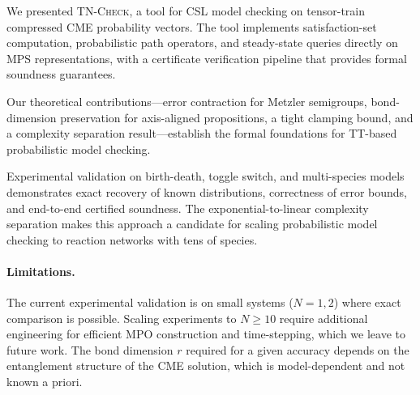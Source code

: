 \documentclass[11pt]{article}
\newcommand{\tncheck}{\textsc{TN-Check}}
\begin{document}
We presented \tncheck{}, a tool for CSL model checking on
tensor-train compressed CME probability vectors.
The tool implements satisfaction-set computation, probabilistic
path operators, and steady-state queries directly on MPS
representations, with a certificate verification pipeline that
provides formal soundness guarantees.

Our theoretical contributions---error contraction for Metzler
semigroups, bond-dimension preservation for axis-aligned propositions,
a tight clamping bound, and a complexity separation
result---establish the formal foundations for TT-based
probabilistic model checking.

Experimental validation on birth-death, toggle switch, and
multi-species models demonstrates exact recovery of known
distributions, correctness of error bounds, and end-to-end
certified soundness.
The exponential-to-linear complexity separation makes
this approach a candidate for scaling probabilistic model
checking to reaction networks with tens of species.

\paragraph{Limitations.}
The current experimental validation is on small systems ($N=1,2$)
where exact comparison is possible.
Scaling experiments to $N \geq 10$ require additional engineering
for efficient MPO construction and time-stepping, which we leave
to future work.
The bond dimension $r$ required for a given accuracy depends on the
entanglement structure of the CME solution, which is model-dependent
and not known a priori.

\end{document}
